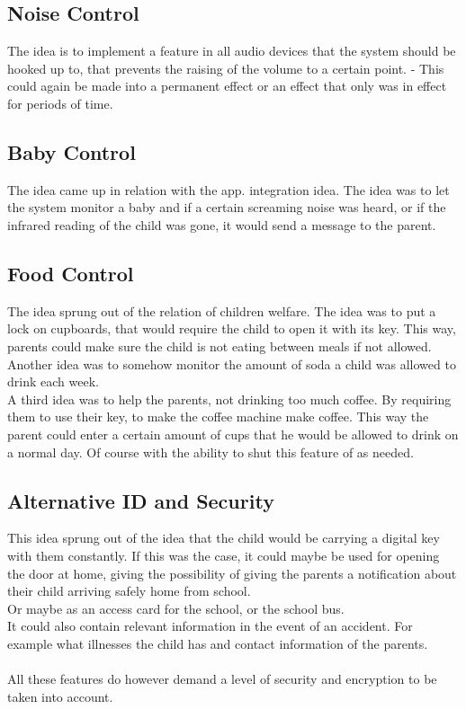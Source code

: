 \subsection{Noise Control}
The idea is to implement a feature in all audio devices that the system should be hooked up to, that prevents the raising of the volume to a certain point. - This could again be made into a permanent effect or an effect that only was in effect for periods of time.

\subsection{Baby Control}
The idea came up in relation with the app. integration idea. The idea was to let the system monitor a baby and if a certain screaming noise was heard, or if the infrared reading of the child was gone, it would send a message to the parent.

\subsection{Food Control}
The idea sprung out of the relation of children welfare. The idea was to put a lock on cupboards, that would require the child to open it with its key. This way, parents could make sure the child is not eating between meals if not allowed.\\
Another idea was to somehow monitor the amount of soda a child was allowed to drink each week.\\
A third idea was to help the parents, not drinking too much coffee. By requiring them to use their key, to make the coffee machine make coffee. This way the parent could enter a certain amount of cups that he would be allowed to drink on a normal day. Of course with the ability to shut this feature of as needed.

\subsection{Alternative ID and Security}
This idea sprung out of the idea that the child would be carrying a digital key with them constantly. If this was the case, it could maybe be used for opening the door at home, giving the possibility of giving the parents a notification about their child arriving safely home from school.\\
Or maybe as an access card for the school, or the school bus.\\
It could also contain relevant information in the event of an accident. For example what illnesses the child has and contact information of the parents.\\
\\
All these features do however demand a level of security and encryption to be taken into account.

